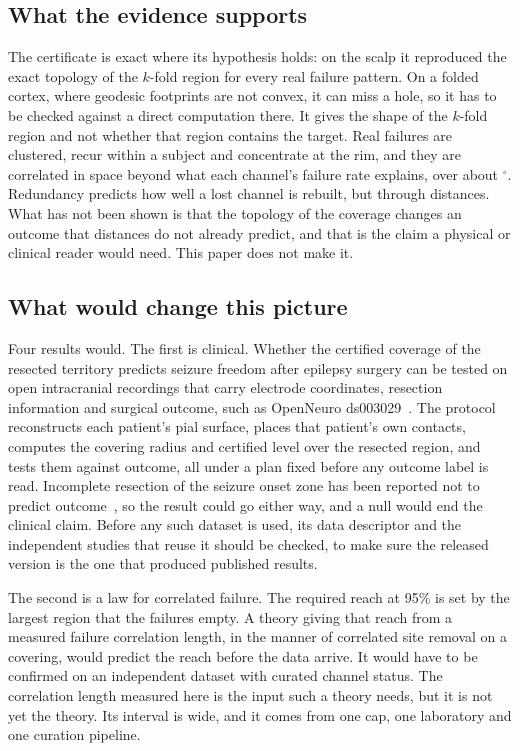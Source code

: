 \documentclass[11pt]{amsart}
\theoremstyle{definition}
\theoremstyle{remark}
\begin{document}
\subsection*{What the evidence supports}
The certificate is exact where its hypothesis holds: on the scalp it
reproduced the exact topology of the $k$-fold region for every real failure
pattern. On a folded cortex, where geodesic footprints are not convex, it can
miss a hole, so it has to be checked against a direct computation there. It
gives the shape of the $k$-fold region and not whether that region contains
the target. Real failures are clustered, recur
within a subject and concentrate at the rim, and they are correlated in space beyond what each channel's failure rate
explains, over about \xiOne$^\circ$. Redundancy
predicts how well a lost channel is rebuilt, but through distances. What has
not been shown is that the topology of the coverage changes an outcome that
distances do not already predict, and that is the claim a physical or
clinical reader would need. This paper does not make it.

\subsection*{What would change this picture}
Four results would. The first is clinical. Whether the certified coverage of
the resected territory predicts seizure freedom after epilepsy surgery can
be tested on open intracranial recordings that carry electrode coordinates,
resection information and surgical outcome, such as OpenNeuro
ds003029~\cite{Li2021}. The protocol reconstructs each patient's pial
surface, places that patient's own contacts, computes the covering radius and
certified level over the resected region, and tests them against outcome, all
under a plan fixed before any outcome label is read. Incomplete resection of the seizure onset zone has been reported not to
predict outcome~\cite{Gascoigne2024}, so the result could go
either way, and a null would end the clinical claim. Before any such dataset
is used, its data descriptor and the independent studies that reuse it should
be checked, to make sure the released version is the one that produced
published results.

The second is a law for correlated failure. The required reach at 95\% is
set by the largest region that the failures empty. A theory giving that reach
from a measured failure correlation length, in the manner of correlated site
removal on a covering, would predict the reach before the data arrive. It
would have to be confirmed on an independent dataset with curated channel
status. The correlation length measured here is the input such a theory needs,
but it is not yet the theory. Its interval is wide, and it comes from one
cap, one laboratory and one curation pipeline.
\end{document}
